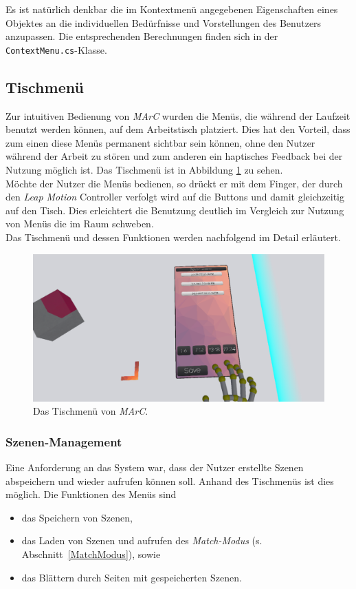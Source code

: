 Es ist natürlich denkbar die im Kontextmenü angegebenen Eigenschaften eines Objektes an die individuellen Bedürfnisse und Vorstellungen des Benutzers anzupassen. Die entsprechenden Berechnungen finden sich in der \texttt{ContextMenu.cs}-Klasse.

\subsection{Tischmenü}\label{sec:TableMenü}
Zur intuitiven Bedienung von \textit{MArC} wurden die Menüs, die während der Laufzeit benutzt werden können, auf dem Arbeitstisch platziert. Dies hat den Vorteil, dass zum einen diese Menüs permanent sichtbar sein können, ohne den Nutzer während der Arbeit zu stören und zum anderen ein haptisches Feedback bei der Nutzung möglich ist. Das Tischmenü ist in Abbildung \ref{fig:Tischmenue} zu sehen.\\
Möchte der Nutzer die Menüs bedienen, so drückt er mit dem Finger, der durch den \textit{Leap Motion} Controller verfolgt wird auf die Buttons und damit gleichzeitig auf den Tisch. Dies erleichtert die Benutzung deutlich im Vergleich zur Nutzung von Menüs die im Raum schweben.\\
Das Tischmenü und dessen Funktionen werden nachfolgend im Detail erläutert.


\begin{figure}
	\centering
	\includegraphics[width=\textwidth]{Bilder/Tablemenu}
	\caption[Tischmenü von \emph{MArC}]{Das Tischmenü von \emph{MArC}.}
	\label{fig:Tischmenue}
\end{figure}
\subsubsection{Szenen-Management}
Eine Anforderung an das System war, dass der Nutzer erstellte Szenen abspeichern und wieder aufrufen können soll. Anhand des Tischmenüs ist dies möglich. Die Funktionen des Menüs sind
\begin{itemize}
	\item das Speichern von Szenen,
	\item das Laden von Szenen und aufrufen des \textit{Match-Modus} (s. Abschnitt~\ref{MatchModus}), sowie
	\item das Blättern durch Seiten mit gespeicherten Szenen.
\end{itemize}

